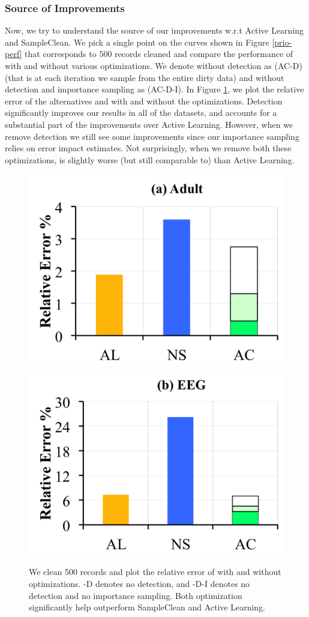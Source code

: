 \subsubsection{Source of Improvements}
Now, we try to understand the source of our improvements w.r.t Active Learning and SampleClean.
We pick a single point on the curves shown in Figure \ref{prio-perf} that corresponds to 500 records cleaned and compare the performance of \sys with and without various optimizations.
We denote \sys without detection as (AC-D) (that is at each iteration we sample from the entire dirty data) and \sys without detection and importance sampling as (AC-D-I).
In Figure \ref{opts}, we plot the relative error of the alternatives and \sys with and without the optimizations.
Detection significantly improves our results in all of the datasets, and accounts for a substantial part of the improvements over Active Learning.
However, when we remove detection we still see some improvements since our importance sampling relies on error impact estimates.
Not surprisingly, when we remove both these optimizations, \sys is slightly worse (but still comparable to) than Active Learning.

\begin{figure}[ht!]
\centering
 \includegraphics[width=0.49\columnwidth]{exp/exp8a.png}
 \includegraphics[width=0.49\columnwidth]{exp/exp8b.png}
 \caption{We clean 500 records and plot the relative error of \sys with and without optimizations. -D denotes no detection, and -D-I denotes no detection and no importance sampling. Both optimization significantly help \sys outperform SampleClean and Active Learning. \label{opts}}
\end{figure}

